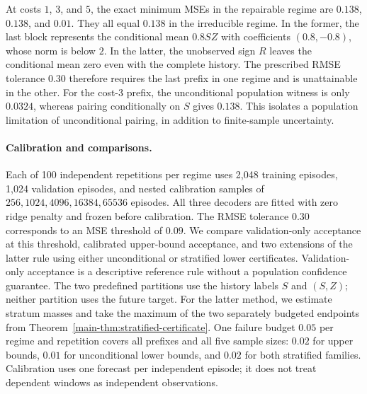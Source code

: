 At costs $1$, $3$, and $5$, the exact minimum MSEs in the repairable regime
are $0.138$, $0.138$, and $0.01$. They all equal $0.138$ in the irreducible
regime. In the former, the last
block represents the conditional mean $0.8SZ$ with coefficients
$(0.8,-0.8)$, whose norm is below $2$. In the latter, the unobserved sign $R$
leaves the conditional mean zero even with the complete history. The prescribed
RMSE tolerance $0.30$ therefore requires the last prefix in one regime and
is unattainable in the other. For the cost-$3$ prefix, the unconditional
population witness is only $0.0324$, whereas pairing conditionally on $S$
gives $0.138$. This isolates a population limitation of unconditional pairing,
in addition to finite-sample uncertainty.

\paragraph{Calibration and comparisons.}
Each of 100 independent repetitions per regime uses 2,048 training episodes,
1,024 validation episodes, and nested calibration samples of
$256,1024,4096,16384,65536$ episodes. All three decoders are fitted with zero
ridge penalty and frozen before calibration. The RMSE tolerance $0.30$
corresponds to an MSE threshold of $0.09$. We compare validation-only
acceptance at this threshold, calibrated upper-bound acceptance, and two
extensions of the latter rule using either unconditional or stratified
lower certificates.
Validation-only acceptance is a descriptive reference rule without a population
confidence guarantee. The two predefined partitions use the history labels
$S$ and $(S,Z)$; neither
partition uses the future target. For the latter method, we estimate
stratum masses and take the maximum of the two separately budgeted endpoints
from Theorem~\ref{main-thm:stratified-certificate}. One failure budget $0.05$ per
regime and repetition covers all prefixes and all five sample sizes:
$0.02$ for upper bounds, $0.01$ for unconditional lower bounds, and $0.02$
for both stratified families. Calibration uses one forecast per independent
episode; it does not treat dependent windows as independent observations.

